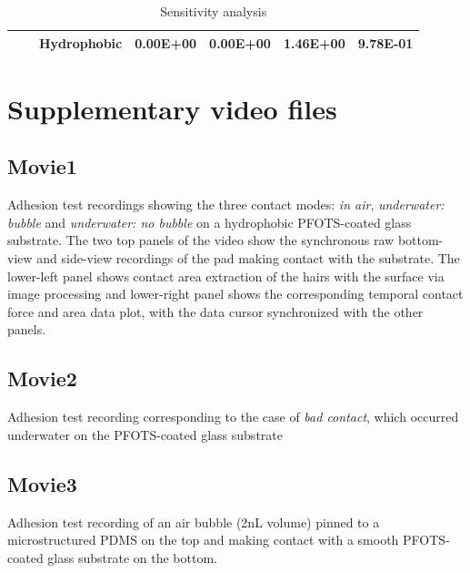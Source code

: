 \documentclass[english]{achemso}
\begin{document}
\begin{table}[H]
\begin{tabular}{|l|l|l|l|l|l|l|}
                                    &                                 & Hydrophobic                                              & 0.00E+00                                  & 0.00E+00                               & \textbf{1.46E+00}                                  & 9.78E-01                               \\ \hline
\end{tabular}
\caption{Sensitivity analysis \label{tab:Sens-anal}}
\end{table}

\section{Supplementary video files}

\subsection*{Movie1}
Adhesion test recordings showing the three contact modes: \emph{in air},  \emph{underwater: bubble} and  \emph{underwater: no bubble} on a hydrophobic PFOTS-coated glass substrate. The two top panels of the video show the synchronous raw bottom-view and side-view recordings of the pad making contact with the substrate. The lower-left panel shows contact area extraction of the hairs with the surface via image processing and lower-right panel shows the corresponding temporal contact force and area data plot, with the data cursor synchronized with the other panels.

\subsection*{Movie2}
Adhesion test recording corresponding to the case of \emph{bad contact}, which occurred underwater on the PFOTS-coated glass substrate

\subsection*{Movie3}
Adhesion test recording of an air bubble (2nL volume) pinned to a microstructured PDMS on the top and making contact with a smooth PFOTS-coated glass substrate on the bottom.


\end{document}
